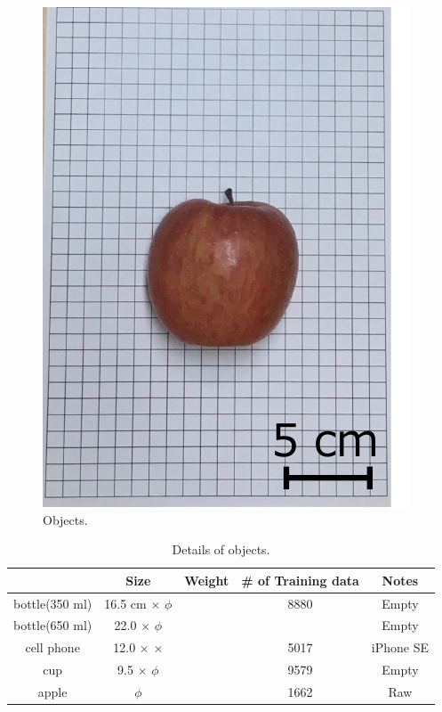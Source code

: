 \begin{figure}[H]
\begin{minipage}{0.19\columnwidth}
        \includegraphics[clip, width=\linewidth]{figure/chapter4/apple}
    \end{minipage}
    
    \caption{Objects.}
    \label{fig:対象物}
    
\end{figure}

\begin{table}[H]
    \centering
    \caption{Details of objects.}
    \begin{tabular}{ccccc}\toprule
        & Size & Weight & \# of Training data & Notes \\ \midrule
        bottle(350 ml) & 16.5 cm $\times$  $\phi$ &  & 8880 & Empty \\ 
        bottle(650 ml) & 22.0 $\times$  $\phi$ &  &  & Empty \\ 
        cell phone & 12.0 $\times$  $\times$  &  & 5017 & iPhone SE \\ 
        cup & 9.5 $\times$  $\phi$ &  & 9579 & Empty \\ 
        apple & $\phi$ &  & 1662 & Raw \\ \bottomrule
    \end{tabular}
    \label{tab:対象物}
\end{table}


